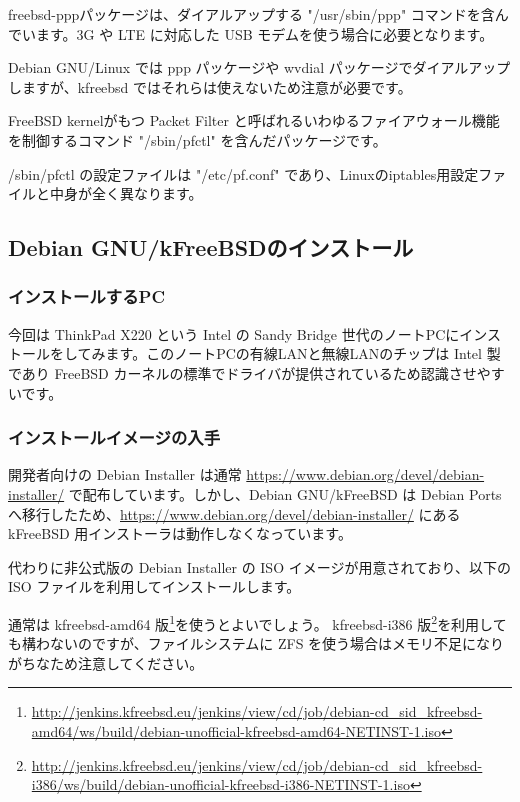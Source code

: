 \documentclass[mingoth,a4paper]{jsarticle}
\begin{document}
freebsd-pppパッケージは、ダイアルアップする "/usr/sbin/ppp" コマンドを含んでいます。3G や LTE に対応した USB モデムを使う場合に必要となります。

Debian GNU/Linux では ppp パッケージや wvdial パッケージでダイアルアップしますが、kfreebsd ではそれらは使えないため注意が必要です。


FreeBSD kernelがもつ Packet Filter と呼ばれるいわゆるファイアウォール機能を制御するコマンド "/sbin/pfctl" を含んだパッケージです。

/sbin/pfctl の設定ファイルは "/etc/pf.conf" であり、Linuxのiptables用設定ファイルと中身が全く異なります。


\subsection{Debian GNU/kFreeBSDのインストール}

\subsubsection{インストールするPC}

今回は ThinkPad X220 という Intel の Sandy Bridge 世代のノートPCにインストールをしてみます。このノートPCの有線LANと無線LANのチップは Intel 製であり FreeBSD カーネルの標準でドライバが提供されているため認識させやすいです。


\subsubsection{インストールイメージの入手}

開発者向けの Debian Installer は通常 \url{https://www.debian.org/devel/debian-installer/} で配布しています。しかし、Debian GNU/kFreeBSD は Debian Ports へ移行したため、\url{https://www.debian.org/devel/debian-installer/} にある kFreeBSD 用インストーラは動作しなくなっています。

代わりに非公式版の Debian Installer の ISO イメージが用意されており、以下の ISO ファイルを利用してインストールします。

通常は kfreebsd-amd64 版\footnote{\url{http://jenkins.kfreebsd.eu/jenkins/view/cd/job/debian-cd_sid_kfreebsd-amd64/ws/build/debian-unofficial-kfreebsd-amd64-NETINST-1.iso}}を使うとよいでしょう。
kfreebsd-i386 版\footnote{\url{http://jenkins.kfreebsd.eu/jenkins/view/cd/job/debian-cd_sid_kfreebsd-i386/ws/build/debian-unofficial-kfreebsd-i386-NETINST-1.iso}}を利用しても構わないのですが、ファイルシステムに ZFS を使う場合はメモリ不足になりがちなため注意してください。
\end{document}
